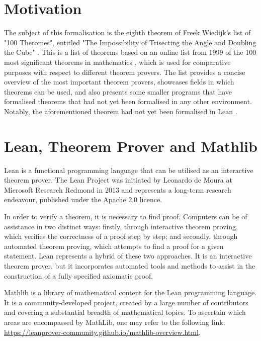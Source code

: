 \section{Motivation}
The subject of this formalisation is the eighth theorem of Freek Wiedijk's list of "100 Theromes", entitled "The Impossibility of Trisecting the Angle and Doubling the Cube" \cite{Wiedijk}. 
This is a list of theorems based on an online list from 1999 of the 100 most significant theorems in mathematics \cite{Abad_Abad}, which is used for comparative purposes with respect to different theorem provers. 
The list provides a concise overview of the most important theorem provers, showcases fields in which theorems can be used, and also presents some smaller programs that have formalised theorems that had not yet been formalised in any other environment.
 Notably, the aforementioned theorem had not yet been formalised in Lean \cite{Lean_Community}.

\section{Lean, Theorem Prover and Mathlib}
Lean is a functional programming language that can be utilised as an interactive theorem prover. 
The Lean Project was initiated by Leonardo de Moura at Microsoft Research Redmond in 2013 and represents a long-term research endeavour, published under the Apache 2.0 licence.

In order to verify a theorem, it is necessary to find proof. 
Computers can be of assistance in two distinct ways: 
firstly, through interactive theorem proving, which verifies the correctness of a proof step by step; 
and secondly, through automated theorem proving, which attempts to find a proof for a given statement. 
Lean represents a hybrid of these two approaches. 
It is an interactive theorem prover, but it incorporates automated tools and methods to assist in the construction of a fully specified axiomatic proof.\cite{Avigad_deMoura_Kong_Ullrich}


Mathlib is a library of mathematical content for the Lean programming language. It is a community-developed project, created by a large number of contributors and covering a substantial breadth of mathematical topics. To ascertain which areas are encompassed by MathLib, one may refer to the following link: \url{https://leanprover-community.github.io/mathlib-overview.html}. 